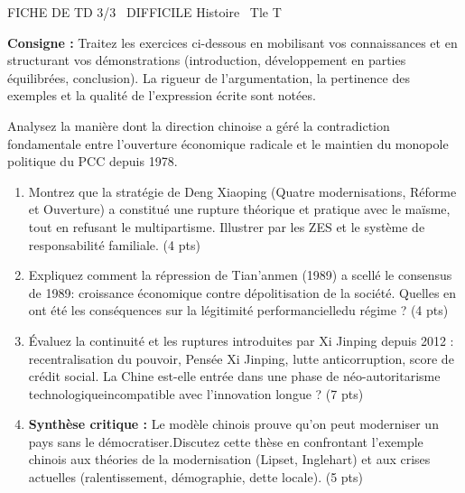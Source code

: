 \documentclass[11pt]{article}
\begin{document}
\begin{tcolorbox}[enhanced,colback=popink,colframe=popink,arc=10pt,boxrule=0pt,left=12pt,right=12pt,top=9pt,bottom=9pt]
{\color{white}\popxbold\small FICHE DE TD 3/3 \textbullet\ DIFFICILE \hfill Histoire \textbullet\ Tle T\par}
\end{tcolorbox}
\vspace{4pt}
\noindent \textbf{Consigne :} Traitez les exercices ci-dessous en mobilisant vos connaissances et en structurant vos démonstrations (introduction, développement en parties équilibrées, conclusion). La rigueur de l'argumentation, la pertinence des exemples et la qualité de l'expression écrite sont notées.

\begin{exercice}
Analysez la manière dont la direction chinoise a géré la contradiction fondamentale entre l'ouverture économique radicale et le maintien du monopole politique du PCC depuis 1978.
\begin{enumerate}
    \item Montrez que la stratégie de Deng Xiaoping (\og Quatre modernisations\fg, \og Réforme et Ouverture\fg) a constitué une rupture théorique et pratique avec le maïsme, tout en refusant le multipartisme. Illustrer par les ZES et le système de responsabilité familiale. (4 pts)
    \item Expliquez comment la répression de Tian'anmen (1989) a scellé le \og consensus de 1989\fg : croissance économique contre dépolitisation de la société. Quelles en ont été les conséquences sur la légitimité \og performancielle\fg du régime ? (4 pts)
    \item Évaluez la continuité et les ruptures introduites par Xi Jinping depuis 2012 : recentralisation du pouvoir, \og Pensée Xi Jinping\fg, lutte anticorruption, score de crédit social. La Chine est-elle entrée dans une phase de \og néo-autoritarisme technologique\fg incompatible avec l'innovation longue ? (7 pts)
    \item \textbf{Synthèse critique :} \og Le modèle chinois prouve qu'on peut moderniser un pays sans le démocratiser.\fg Discutez cette thèse en confrontant l'exemple chinois aux théories de la modernisation (Lipset, Inglehart) et aux crises actuelles (ralentissement, démographie, dette locale). (5 pts)
\end{enumerate}
\end{exercice}
\end{document}
